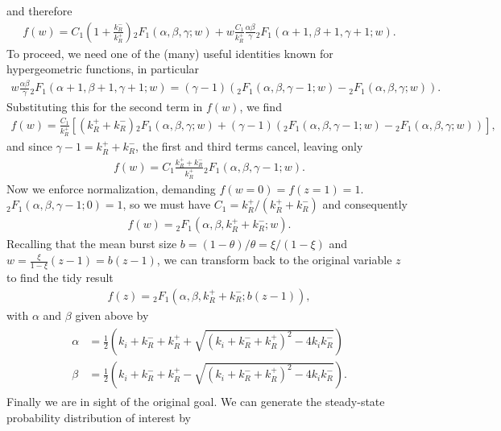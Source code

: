 and therefore
\begin{align}
f(w) = C_1\left(1 + \frac{k_R^-}{k_R^+}\right)
        {_2F_1}(\alpha, \beta, \gamma; w)
+ w \frac{C_1}{k_R^+} \frac{\alpha\beta}{\gamma}
        {_2F_1}(\alpha+1, \beta+1, \gamma+1; w).
\end{align}
To proceed, we need one of the (many) useful identities known for
hypergeometric functions, in particular
\begin{align}
w\frac{\alpha\beta}{\gamma} {_2F_1}(\alpha+1, \beta+1, \gamma+1; w)
=
(\gamma-1)\left(
{_2F_1}(\alpha, \beta, \gamma-1; w) - {_2F_1}(\alpha, \beta, \gamma; w)
\right).
\end{align}
Substituting this for the second term in $f(w)$, we find
\begin{align}
f(w) = \frac{C_1}{k_R^+}
\left[
        \left(k_R^+ + k_R^-\right)
        {_2F_1}(\alpha, \beta, \gamma; w)
+ (\gamma-1)\left(
        {_2F_1}(\alpha, \beta, \gamma-1; w) - {_2F_1}(\alpha, \beta, \gamma; w)
        \right)
\right],
\end{align}
and since $\gamma-1 = k_R^+ + k_R^-$, the first and third terms cancel,
leaving only
\begin{align}
f(w) = C_1\frac{k_R^+ + k_R^-}{k_R^+} {_2F_1}(\alpha, \beta, \gamma-1; w).
\end{align}
Now we enforce normalization, demanding $f(w=0) = f(z=1) = 1$.
${_2F_1}(\alpha, \beta, \gamma-1; 0) = 1$, so we must have
$C_1 = k_R^+ / (k_R^+ + k_R^-)$ and consequently
\begin{align}
f(w) =  {_2F_1}(\alpha, \beta, k_R^+ + k_R^-; w).
\end{align}
Recalling that the mean burst size $b = (1-\theta)/\theta = \xi/(1-\xi)$
and $w = \frac{\xi}{1-\xi} (z-1) = b (z-1)$,
we can transform back to the original variable $z$ to find the tidy result
\begin{align}
f(z) =  {_2F_1}(\alpha, \beta, k_R^+ + k_R^-; b(z-1)),
\end{align}
with $\alpha$ and $\beta$ given above by
\begin{align}
\begin{split}
\alpha &= \frac{1}{2}
\left(k_i+k_R^-+k_R^+ + \sqrt{(k_i+k_R^-+k_R^+)^2 - 4k_i k_R^-}\right)
\\
\beta &= \frac{1}{2}
\left(k_i+k_R^-+k_R^+ - \sqrt{(k_i+k_R^-+k_R^+)^2 - 4k_i k_R^-}\right).
\end{split}
\end{align}
Finally we are in sight of the original goal. We can generate the
steady-state probability distribution of interest by
